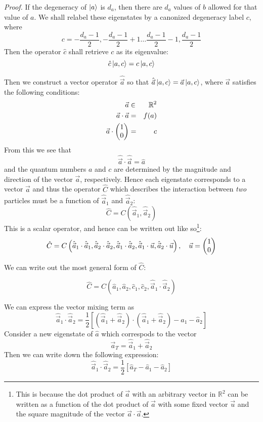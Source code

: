 \documentclass[12pt]{article}
\begin{document}
	\textit{Proof.} If the degeneracy of $\ket{a}$ is $d_a$, then there are $d_a$ values of $b$ allowed for that value of $a$. We shall relabel these eigenstates by a canonized degeneracy label $c$, where
	$$c=-\frac{d_a-1}{2},-\frac{d_a-1}{2}+1\dots \frac{d_a-1}{2}-1, \frac{d_a-1}{2}$$
	Then the operator $\hat{c}$ shall retrieve $c$ as its eigenvalue:
	$$\hat{c}\ket{a,c}=c\ket{a,c}$$
	
	Then we construct a vector operator $\hat{\vec{a}}$ so that $\hat{\vec{a}}\ket{a,c}=\vec{a}\ket{a,c}$, where $\vec{a}$ satisfies the following conditions:
	\begin{eqnarray*}
	\vec{a}&\in &\mathbb{R}^2\\
	\vec{a}\cdot\vec{a}&=&f(a)\\
	\vec{a}\cdot \mqty(1 \\ 0) &=& c
	\end{eqnarray*}
	From this we see that
	$$\hat{\vec{a}}\cdot \hat{\vec{a}} = \hat{a}$$
	and the quantum numbers $a$ and $c$ are determined by the magnitude and direction of the vector $\vec{a}$, respectively. Hence each eigenstate corresponds to a vector $\vec{a}$ and thus the operator $\hat{C}$ which describes the interaction between \textit{two} particles must be a function of $\hat{\vec{a}}_1$ and $\hat{\vec{a}}_2$:
	$$\hat{C}=C(\hat{\vec{a}}_1, \hat{\vec{a}}_2)$$
	This is a scalar operator, and hence can be written out like so\footnote{This is because the dot product of $\vec{a}$ with an arbitrary vector in $\mathbb{R}^2$ can be written as a function of the dot product of $\vec{a}$ with some fixed vector $\vec{u}$ and the square magnitude of the vector $\vec{a}\cdot\vec{a}$.}:
	$$\hat{C}=C\left(\hat{\vec{a}}_1\cdot\hat{\vec{a}}_1,\hat{\vec{a}}_2\cdot\hat{\vec{a}}_2,\hat{\vec{a}}_1\cdot\hat{\vec{a}}_2,\hat{\vec{a}}_1\cdot \vec{u},\hat{\vec{a}}_2\cdot \vec{u}\right),\quad \vec{u}=\mqty(1\\0)$$
	
	We can write out the most general form of $\hat{C}$:
	
	$$\hat{C}=C\left(\hat{a}_1,\hat{a}_2,\hat{c}_1,\hat{c}_2,\hat{\vec{a}}_1\cdot\hat{\vec{a}}_2\right)$$
	
	We can express the vector mixing term as
	$$\hat{\vec{a}}_1\cdot\hat{\vec{a}}_2=\frac{1}{2}\left[\left(\hat{\vec{a}}_1+\hat{\vec{a}}_2\right)\cdot \left(\hat{\vec{a}}_1+\hat{\vec{a}}_2\right) - \hat{a}_1 - \hat{a}_2\right]$$
	Consider a new eigenstate of $\hat{a}$ which correspods to the vector
	$$\vec{a}_T=\hat{\vec{a}}_1+\hat{\vec{a}}_2$$
	Then we can write down the following expression:
	$$\hat{\vec{a}}_1\cdot\hat{\vec{a}}_2=\frac{1}{2}\left[\hat{a}_T- \hat{a}_1 - \hat{a}_2\right]$$
	
\end{document}
